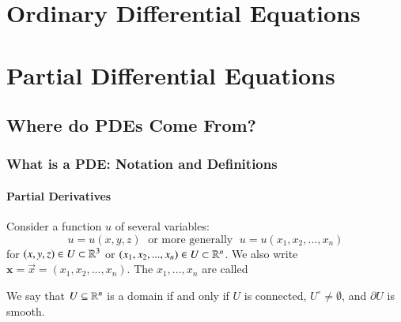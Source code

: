 \documentclass[12pt, a4paper, oneside, openright, titlepage]{book}
\begin{document}
\tableofcontents








\part{Ordinary Differential Equations}




\part{Partial Differential Equations}



\chapter{Where do PDEs Come From?}

\section{What is a PDE: Notation and Definitions}

\subsection{Partial Derivatives}

Consider a function $u$ of several variables: \begin{equation*}
    u = u(x,y,z)\;\text{ or more generally }\;u = u(x_1,x_2,...,x_n)
\end{equation*}
for $(x,y,z) \in U \subset \mathbb R^3$ or $(x_1,x_2,...,x_n) \in U \subset \mathbb R^n$. We also write $\mathbf{x} = \vec{x} = (x_1,x_2,...,x_n)$. The $x_1,...,x_n$ are called 

\begin{defn}
    We say that $U \subseteq \mathbb R^n$ is a domain if and only if $U$ is connected, $U^{\circ} \neq \emptyset$, and $\partial U$ is smooth.
\end{defn}
\end{document}
